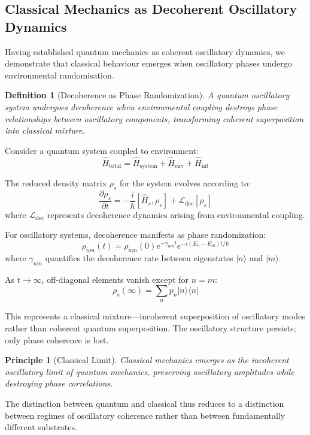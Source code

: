 \documentclass[12pt,a4paper]{article}
\newtheorem{definition}{Definition}
\newtheorem{principle}{Principle}
\begin{document}
\subsection{Classical Mechanics as Decoherent Oscillatory Dynamics}

Having established quantum mechanics as coherent oscillatory dynamics, we demonstrate that classical behaviour emerges when oscillatory phases undergo environmental randomisation.

\begin{definition}[Decoherence as Phase Randomization]
A quantum oscillatory system undergoes decoherence when environmental coupling destroys phase relationships between oscillatory components, transforming coherent superposition into classical mixture.
\end{definition}

Consider a quantum system coupled to environment:
$$\hat{H}_{\text{total}} = \hat{H}_{\text{system}} + \hat{H}_{\text{env}} + \hat{H}_{\text{int}}$$

The reduced density matrix $\rho_s$ for the system evolves according to:
$$\frac{\partial \rho_s}{\partial t} = -\frac{i}{\hbar}[\hat{H}_s, \rho_s] + \mathcal{L}_{\text{dec}}[\rho_s]$$
where $\mathcal{L}_{\text{dec}}$ represents decoherence dynamics arising from environmental coupling.

For oscillatory systems, decoherence manifests as phase randomization:
$$\rho_{nm}(t) = \rho_{nm}(0) e^{-\gamma_{nm} t} e^{-i(E_n - E_m)t/\hbar}$$
where $\gamma_{nm}$ quantifies the decoherence rate between eigenstates $|n\rangle$ and $|m\rangle$.

As $t \to \infty$, off-diagonal elements vanish except for $n = m$:
$$\rho_s(\infty) = \sum_n p_n |n\rangle\langle n|$$

This represents a classical mixture—incoherent superposition of oscillatory modes rather than coherent quantum superposition. The oscillatory structure persists; only phase coherence is lost.

\begin{principle}[Classical Limit]
Classical mechanics emerges as the incoherent oscillatory limit of quantum mechanics, preserving oscillatory amplitudes while destroying phase correlations.
\end{principle}

The distinction between quantum and classical thus reduces to a distinction between regimes of oscillatory coherence rather than between fundamentally different substrates.
\end{document}

